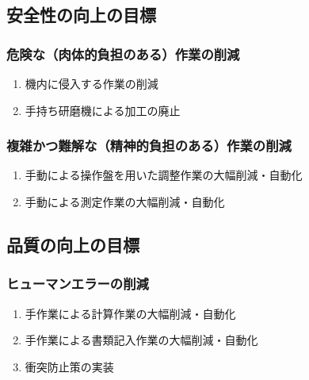 \clearpage
\subsection{安全性の向上の目標}

\subsubsection{危険な（肉体的負担のある）作業の削減}
\begin{enumerate}[label=\sarrow]
\item 機内に侵入する作業の削減
\item 手持ち研磨機による加工の廃止
\end{enumerate}

\subsubsection{複雑かつ難解な（精神的負担のある）作業の削減}
\begin{enumerate}[label=\sarrow]
\item 手動による操作盤を用いた調整作業の大幅削減・自動化
\item 手動による測定作業の大幅削減・自動化
\end{enumerate}


\subsection{品質の向上の目標}

\subsubsection{ヒューマンエラーの削減}
\begin{enumerate}[label=\sarrow]
\item 手作業による計算作業の大幅削減・自動化
\item 手作業による書類記入作業の大幅削減・自動化
\item 衝突防止策の実装
\end{enumerate}

